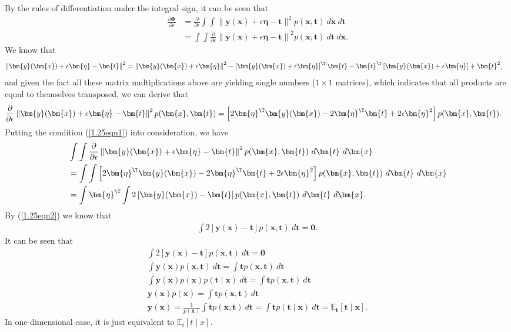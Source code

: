 \begin{answer}{}
	By the rules of differentiation under the integral sign, it can be seen that
	\begin{align}
		\frac{\partial \bm{\Phi}}{\partial \epsilon} &= \frac{\partial}{\partial \epsilon} \int\int \lVert \bm{y}(\bm{x}) + \epsilon\bm{\eta} - \bm{t} \rVert^2 p(\bm{x}, \bm{t})\ d\bm{x}\ d\bm{t}\\
		&= \int\int \frac{\partial}{\partial \epsilon}\left\lVert \bm{y}(\bm{x}) + \epsilon\bm{\eta} - \bm{t} \right\rVert^2 p(\bm{x}, \bm{t})\ d\bm{t}\ d\bm{x}.
	\end{align}
	We know that
	\begin{align}
		\left\lVert \bm{y}(\bm{x}) + \epsilon\bm{\eta} - \bm{t} \right\rVert^2 &= \left\lVert \bm{y}(\bm{x}) + \epsilon\bm{\eta} \right\rVert^2 - \left[\bm{y}(\bm{x}) + \epsilon\bm{\eta}\right]^{\T}\bm{t} - \bm{t}^{\T}\left[\bm{y}(\bm{x}) + \epsilon\bm{\eta}\right] + \bm{t}^2,
	\end{align}
	and given the fact all these matrix multiplications above are yielding single numbers ($1 \times 1$ matrices), which indicates that all products are equal to themselves transposed, we can derive that
	\begin{align}
		\frac{\partial}{\partial \epsilon} \left\lVert \bm{y}(\bm{x}) + \epsilon\bm{\eta} - \bm{t} \right\rVert^2 p(\bm{x}, \bm{t}) &= \left[2\bm{\eta}^{\T}\bm{y}(\bm{x}) - 2\bm{\eta}^{\T}\bm{t} + 2\epsilon\bm{\eta}^2\right]p(\bm{x}, \bm{t}).
	\end{align}
	Putting the condition (\ref{1.25eqn1}) into consideration, we have
	\begin{align}
		&\int\int \frac{\partial}{\partial \epsilon}\left\lVert \bm{y}(\bm{x}) + \epsilon\bm{\eta} - \bm{t} \right\rVert^2 p(\bm{x}, \bm{t})\ d\bm{t}\ d\bm{x}\\
		&= \int\int \left[2\bm{\eta}^{\T}\bm{y}(\bm{x}) - 2\bm{\eta}^{\T}\bm{t} + 2\epsilon\bm{\eta}^2\right]p(\bm{x}, \bm{t}) \ d\bm{t}\ d\bm{x}\\
		&=  \int \bm{\eta}^{\T}\int 2\left[\bm{y}(\bm{x}) - \bm{t}\right]p(\bm{x}, \bm{t}) \ d\bm{t}\ d\bm{x}.
	\end{align}
	By (\ref{1.25eqn2}) we know that
	\begin{align}
		\int 2\left[\bm{y}(\bm{x}) - \bm{t} \right]p(\bm{x}, \bm{t})\ d\bm{t} = \bm{0}. 
	\end{align}
	It can be seen that
	\begin{gather}
		\int 2\left[\bm{y}(\bm{x}) - \bm{t} \right]p(\bm{x}, \bm{t})\ d\bm{t} = \bm{0}\\
		\int \bm{y}(\bm{x}) p(\bm{x}, \bm{t})\ d\bm{t} = \int \bm{t} p(\bm{x}, \bm{t})\ d\bm{t}\\
		\int \bm{y}(\bm{x}) p(\bm{x}) p(\bm{t} \mid \bm{x})\ d\bm{t} = \int \bm{t} p(\bm{x}, \bm{t})\ d\bm{t}\\
		\bm{y}(\bm{x})p(\bm{x}) = \int \bm{t} p(\bm{x}, \bm{t})\ d\bm{t}\\
		\bm{y}(\bm{x}) = \frac{1}{p(\bm{x})}\int \bm{t} p(\bm{x}, \bm{t})\ d\bm{t} = \int \bm{t} p(\bm{t} \mid \bm{x})\ d\bm{t} = \mathbb{E}_{\bm{t}}\left[\bm{t} \mid \bm{x}\right].
	\end{gather}
	In one-dimensional case, it is just equivalent to $\mathbb{E}_{t}\left[t \mid x\right]$.
\end{answer}